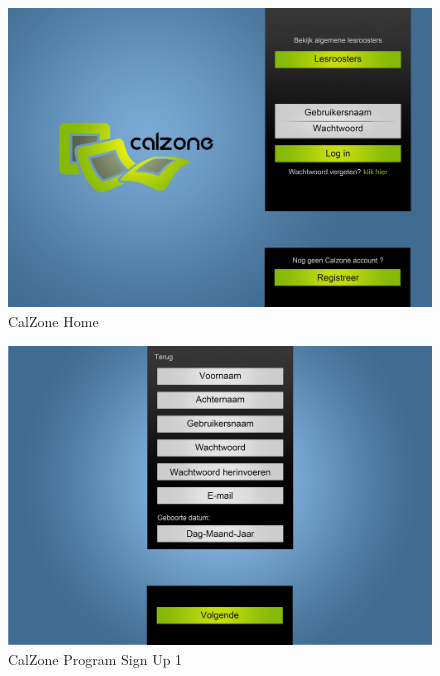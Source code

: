 \begin{center}
\begin{figure}[H]
\caption{CalZone Home}
\centerline{\includegraphics[scale=0.4]{img/Calzonemain}}
\label{fig:CalZone Home}
\end{figure}

\begin{figure}[H]
\caption{CalZone Program Sign Up 1}
\centerline{\includegraphics[scale=0.4]{img/Calzonesignup1}}
\label{fig:CalZone Program Sign Up}
\end{figure}


\end{center}
